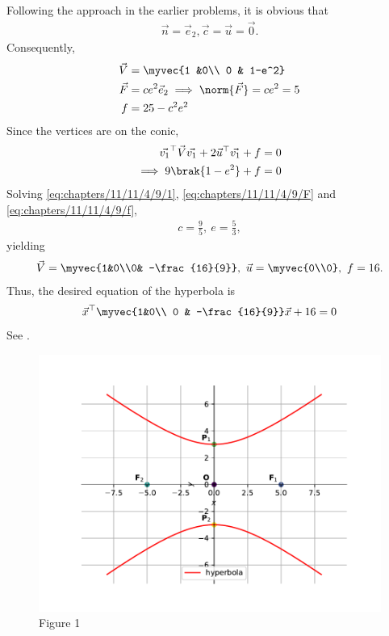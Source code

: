 Following the approach in the earlier problems, it is obvious that
	\begin{align}
		\vec{n} 
			= \vec{e}_2,
	\vec{c} =\vec{u}=\vec{0}.
\end{align}
Consequently,
%
\begin{align}
	\vec{V} &= \myvec{1 &0\\ 0 & 1-e^2}
	\\
	\vec{F} &= ce^2\vec{e}_2 \implies \norm{\vec{F}} = ce^2=5
\label{eq:chapters/11/11/4/9/F}
	\\
	f 
	  &= 25 - c^2 e^2
\label{eq:chapters/11/11/4/9/f}
\end{align}
%
Since the vertices are  on the conic,
\begin{align}
	\vec{v_1}^{\top}\vec{V}\vec{v_1} +2\vec{u}^{\top}\vec{v_1}+f &= 0\\
\implies 9\brak{1-e^2} + f &= 0\\
 \label{eq:chapters/11/11/4/9/1}
\end{align}
Solving \eqref{eq:chapters/11/11/4/9/1},
\eqref{eq:chapters/11/11/4/9/F}
and
\eqref{eq:chapters/11/11/4/9/f},
\begin{align}
	c = \frac{9}{5},\ 
	e = \frac{5}{3},
\end{align}
%
yielding
\begin{align}
	\vec{V} = \myvec{1&0\\0& -\frac{16}{9}} ,\
	\vec{u} = \myvec{0\\0},\
	f = 16.
\end{align}
%
Thus, the desired equation of the hyperbola is
\begin{align}
	\vec{x}^{\top} \myvec{1&0\\ 0 & -\frac{16}{9}} \vec{x} +16 =0
\end{align}
%
See
%
    .
\begin{figure}[H]
  \centering
    \includegraphics[width=0.75\columnwidth]{chapters/11/11/4/9/figs/fig.pdf}
    \caption{Figure 1}
    \label{fig:chapters/11/11/4/9/}
\end{figure}
%



